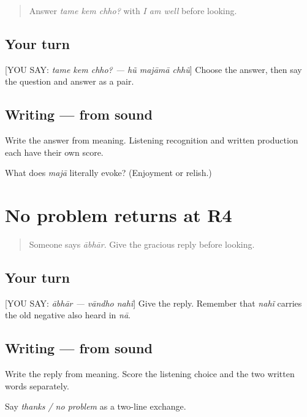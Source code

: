\label{lesson:GU-R18-majaa-r4}



\begin{quote}
Answer \emph{tame kem chho?} with \emph{I am well} before looking.
\end{quote}

\subsection*{Your turn}
{[}YOU SAY: \emph{tame kem chho? — hũ majāmā chhũ}{]} Choose the answer, then say the question and answer as a pair.

\subsection*{Writing — from sound}
Write the answer from meaning. Listening recognition and written production each have their own score.

\begin{tcolorbox}[breakable,colback=teal!4,colframe=teal!35!black,title={Before you move on}]
What does \emph{majā} literally evoke? (Enjoyment or relish.)
\end{tcolorbox}
\section[Practice]{No problem returns at R4}

\label{lesson:GU-R18-no-problem-r4}



\begin{quote}
Someone says \emph{ābhār}. Give the gracious reply before looking.
\end{quote}

\subsection*{Your turn}
{[}YOU SAY: \emph{ābhār — vāndho nahĩ}{]} Give the reply. Remember that \emph{nahĩ} carries the old negative also heard in \emph{nā}.

\subsection*{Writing — from sound}
Write the reply from meaning. Score the listening choice and the two written words separately.

\begin{tcolorbox}[breakable,colback=teal!4,colframe=teal!35!black,title={Before you move on}]
Say \emph{thanks / no problem} as a two-line exchange.
\end{tcolorbox}
